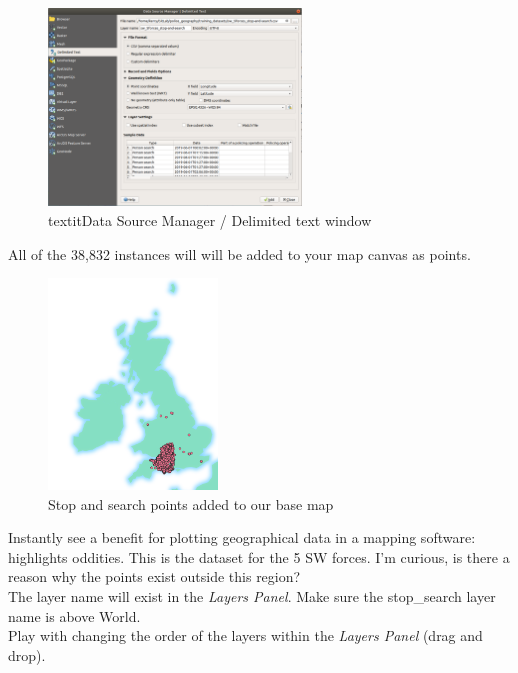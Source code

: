 \begin{figure}[!h]
	\centering
	\includegraphics[width=0.6\textwidth]{images/add_delimited_text_stop_and_search.png}
	\caption{textit{Data Source Manager / Delimited text} window}
	\label{ft_fig_firstfig3}
\end{figure}

All of the 38,832 instances will will be added to your map canvas as points.\\

\begin{figure}[!h]
	\centering
	\includegraphics[width=0.4\textwidth]{images/stop_search_38832_points_over_uk.png}
	\caption{Stop and search points added to our base map}
	\label{ft_fig_firstfig3}
\end{figure}

Instantly see a benefit for plotting geographical data in a mapping software: highlights oddities. This is the dataset for the 5 SW forces. I'm curious, is there a reason why the points exist outside this region?\\

The layer name will exist in the \textit{Layers Panel}. Make sure the stop\_search layer name is above World.\\
Play with changing the order of the layers within the \textit{Layers Panel} (drag and drop).\\


